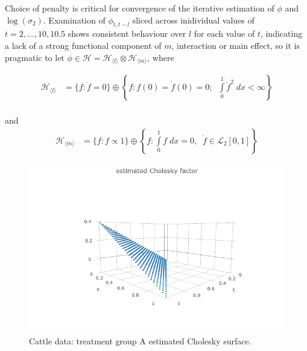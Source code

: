 \documentclass[12pt]{article}
\newcommand{\hilbert}{\mathcal{H}}
\newcommand{\hilbertl}{\mathcal{H}_{\langle l \rangle}}
\newcommand{\hilbertm}{\mathcal{H}_{\langle m \rangle}}
\newcommand{\hilbertlnull}{\mathcal{H}_{0\langle l \rangle}}
\newcommand{\hilbertmnull}{\mathcal{H}_{0\langle m \rangle}}
\newcommand{\hilbertlpen}{\mathcal{H}_{1\langle l \rangle}}
\newcommand{\hilbertmpen}{\mathcal{H}_{1\langle m \rangle}}
\theoremstyle{definition}
\begin{document}
Choice of penalty is critical for convergence of the iterative estimation of $\phi$ and $\log\left(\sigma_2 \right)$. Examination of $\phi_{t,t-l}$ sliced across  inidividual values of $t = 2,\dots, 10, 10.5$ shows consistent behaviour over $l$ for each value of $t$, indicating a lack of a strong functional component of $m$, interaction or main effect, so it is pragmatic to let $\phi \in \hilbert = \hilbertl \otimes \hilbertm$, where 

\begin{align*} 
\hilbertl &= \bigg\{ f: \ddot{f} = 0 \bigg\} \oplus \left\{f: f\left(0\right) = \dot{f}\left(0\right) = 0; \;\; \int\limits_0^1 \ddot{f}^2 \;dx < \infty \right\} \\
\end{align*} 

\noindent
and
\begin{align*} 
\hilbertm &= \bigg\{ f: f \propto 1 \bigg\} \oplus \left\{ f: \int\limits_0^1 f \;dx = 0, \;\; \dot{f} \in \mathcal{L}_2\left[0,1\right]  \right\} \\
\end{align*} 


\begin{figure}[H]
\begin{center}
\includegraphics[width = \textwidth]{img/cattle/estimated-cholesky-surface-3d}
\end{center}
\label{fig:cattleA-phi-3d}
\caption{Cattle data: treatment group A estimated Cholesky surface.}
\end{figure}
\end{document}
